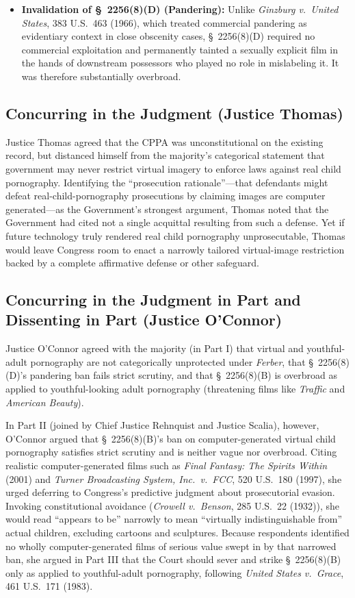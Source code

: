 \documentclass[12pt]{article}
\begin{document}
\begin{itemize}
\item \textbf{Invalidation of \S~2256(8)(D) (Pandering):} Unlike \textit{Ginzburg v.\ United States}, 383 U.S.\ 463 (1966), which treated commercial pandering as evidentiary context in close obscenity cases, \S~2256(8)(D) required no commercial exploitation and permanently tainted a sexually explicit film in the hands of downstream possessors who played no role in mislabeling it. It was therefore substantially overbroad.
\end{itemize}

\subsection{Concurring in the Judgment (Justice Thomas)}

Justice Thomas agreed that the CPPA was unconstitutional on the existing record, but distanced himself from the majority's categorical statement that government may never restrict virtual imagery to enforce laws against real child pornography. Identifying the ``prosecution rationale''---that defendants might defeat real-child-pornography prosecutions by claiming images are computer generated---as the Government's strongest argument, Thomas noted that the Government had cited not a single acquittal resulting from such a defense. Yet if future technology truly rendered real child pornography unprosecutable, Thomas would leave Congress room to enact a narrowly tailored virtual-image restriction backed by a complete affirmative defense or other safeguard.

\subsection{Concurring in the Judgment in Part and Dissenting in Part (Justice O'Connor)}

Justice O'Connor agreed with the majority (in Part I) that virtual and youthful-adult pornography are not categorically unprotected under \textit{Ferber}, that \S~2256(8)(D)'s pandering ban fails strict scrutiny, and that \S~2256(8)(B) is overbroad as applied to youthful-looking adult pornography (threatening films like \textit{Traffic} and \textit{American Beauty}).

In Part II (joined by Chief Justice Rehnquist and Justice Scalia), however, O'Connor argued that \S~2256(8)(B)'s ban on computer-generated virtual child pornography satisfies strict scrutiny and is neither vague nor overbroad. Citing realistic computer-generated films such as \textit{Final Fantasy: The Spirits Within} (2001) and \textit{Turner Broadcasting System, Inc.\ v.\ FCC}, 520 U.S.\ 180 (1997), she urged deferring to Congress's predictive judgment about prosecutorial evasion. Invoking constitutional avoidance (\textit{Crowell v.\ Benson}, 285 U.S.\ 22 (1932)), she would read ``appears to be'' narrowly to mean ``virtually indistinguishable from'' actual children, excluding cartoons and sculptures. Because respondents identified no wholly computer-generated films of serious value swept in by that narrowed ban, she argued in Part III that the Court should sever and strike \S~2256(8)(B) only as applied to youthful-adult pornography, following \textit{United States v.\ Grace}, 461 U.S.\ 171 (1983).
\end{document}
